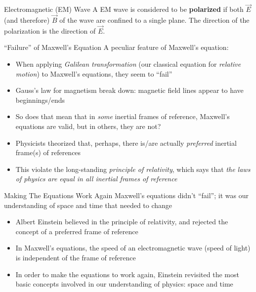 \documentclass[12pt,aspectratio=169]{beamer}
\begin{document}
\begin{frame}{Electromagnetic (EM) Wave}
  A EM wave is considered to be \textbf{polarized} if both $\vec E$
  (and therefore) $\vec B$ of the wave are confined to a single plane. The
  direction of the polarization is the direction of $\vec E$.
  \begin{center}
  \end{center}
\end{frame}



\begin{frame}{``Failure'' of Maxwell's Equation}
  A peculiar feature of Maxwell's equation:
  \begin{itemize}
  \item When applying \emph{Galilean transformation} (our classical equation for
    \emph{relative motion}) to Maxwell's equations, they seem to ``fail''
  \item Gauss's law for magnetism break down: magnetic field lines appear to
    have beginnings/ends
  \item So does that mean that in \emph{some} inertial frames of reference,
    Maxwell's equations are valid, but in others, they are not?
  \item Physicists theorized that, perhaps, there is/are actually
    \emph{preferred} inertial frame(s) of references
  \item This violate the long-standing
    \emph{principle of relativity}, which says that
    \emph{the laws of physics are equal in all inertial frames of reference}
  \end{itemize}
\end{frame}



\begin{frame}{Making The Equations Work Again}
  Maxwell's equations didn't ``fail''; it was our understanding of space and
  time that needed to change
  \begin{itemize}
  \item Albert Einstein believed in the principle of relativity, and rejected
    the concept of a preferred frame of reference
  \item In Maxwell's equations, the speed of an electromagnetic wave (speed of
    light) is independent of the frame of reference
  \item In order to make the equations to work again, Einstein revisited the
    most basic concepts involved in our understanding of physics: space and
    time
  \end{itemize}
\end{frame}
\end{document}
